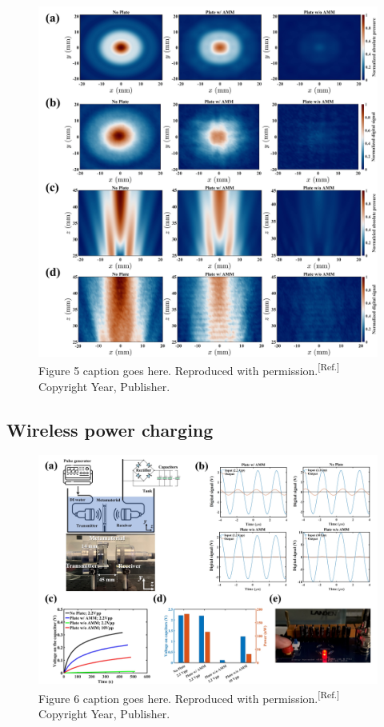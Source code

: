 \documentclass{WileyMSP-template}
\begin{document}
\begin{figure}
  \includegraphics[width=\linewidth]{Figure5V2.jpg}
  \caption{Figure 5 caption goes here. Reproduced with permission.\textsuperscript{[Ref.]} Copyright Year, Publisher.}
  \label{fig:boat1}
\end{figure}




\subsection{Wireless power charging}

\begin{figure}
  \includegraphics[width=\linewidth]{Figure6.jpg}
  \caption{Figure 6 caption goes here. Reproduced with permission.\textsuperscript{[Ref.]} Copyright Year, Publisher.}
  \label{fig:boat1}
\end{figure}
\end{document}
